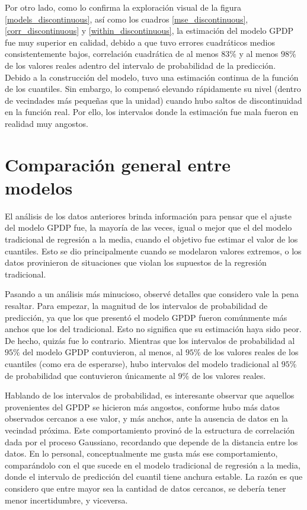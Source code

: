 Por otro lado, como lo confirma la exploraci\'on visual de la figura \ref{models_discontinuous}, as\'i como los cuadros \ref{mse_discontinuous}, \ref{corr_discontinuous} y \ref{within_discontinuous}, la estimaci\'on del modelo GPDP fue muy superior en calidad, debido a que tuvo errores cuadr\'aticos medios consistentemente bajos, correlaci\'on cuadr\'atica de al menos $83\%$ y al menos $98\%$ de los valores reales adentro del intervalo de probabilidad de la predicci\'on. Debido a la construcci\'on del modelo, tuvo una estimaci\'on continua de la funci\'on de los cuantiles. Sin embargo, lo compens\'o elevando r\'apidamente su nivel (dentro de vecindades m\'as pequeñas que la unidad) cuando hubo saltos de discontinuidad en la funci\'on real. Por ello, los intervalos donde la estimaci\'on fue mala fueron en realidad muy angostos.

\section{Comparaci\'on general entre modelos}
\label{models_comp}

El an\'alisis de los datos anteriores brinda informaci\'on para pensar que el ajuste del modelo GPDP fue, la mayor\'ia de las veces, igual o mejor que el del modelo tradicional de regresi\'on a la media, cuando el objetivo fue estimar el valor de los cuantiles. Esto se dio principalmente cuando se modelaron valores extremos, o los datos provinieron de situaciones que violan los supuestos de la regresi\'on tradicional. 

Pasando a un an\'alisis m\'as minucioso, observ\'e detalles que considero vale la pena resaltar. Para empezar, la magnitud de los intervalos de probabilidad de predicci\'on, ya que los que present\'o el modelo GPDP fueron com\'unmente m\'as anchos que los del tradicional. Esto no significa que su estimaci\'on haya sido peor. De hecho, quiz\'as fue lo contrario. Mientras que los intervalos de probabilidad al $95\%$ del modelo GPDP contuvieron, al menos, al $95\%$ de los valores reales de los cuantiles (como era de esperarse), hubo intervalos del modelo tradicional al $95\%$ de probabilidad que contuvieron \'unicamente al $9\%$ de los valores reales.

Hablando de los intervalos de probabilidad, es interesante observar que aquellos provenientes del GPDP se hicieron m\'as angostos, conforme hubo m\'as datos observados cercanos a ese valor, y m\'as anchos, ante la ausencia de datos en la vecindad pr\'oxima. Este comportamiento provin\'o de la estructura de correlaci\'on dada por el proceso Gaussiano, recordando que depende de la distancia entre los datos. En lo personal, conceptualmente me gusta m\'as ese comportamiento, compar\'andolo con el que sucede en el modelo tradicional de regresi\'on a la media, donde el intervalo de predicci\'on del cuantil tiene anchura estable. La raz\'on es que considero que entre mayor sea la cantidad de datos cercanos, se deber\'ia tener menor incertidumbre, y viceversa.

